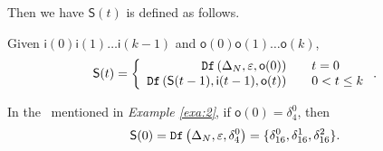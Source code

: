  Then we have $\mathsf{S}(t)$ is defined as follows. 
 \begin{definition}[$\mathsf{S}(t)$] Given $\mathsf{i}(0)\mathsf{i}(1)\ldots\mathsf{i}(k-1)$ and $\mathsf{o}(0)\mathsf{o}(1)\ldots\mathsf{o}(k)$, %
	\[\mathsf{S}(t)=\left\{
\begin{array}{rcl}
{\tt Df}\left(\Delta_N,\varepsilon,\mathsf{o}(0)\right)      &      & {t=0}\\
{\tt Df}\left(\mathsf{S}(t-1),\mathsf{i}(t-1),\mathsf{o}(t)\right)       &      & 0<t\leq k
\end{array} \right. .\]

\end{definition}
\begin{example}
In the \BCN\ mentioned in {\em Example \ref{exa:2}}, if $\mathsf{o}(0)=\delta_4^0$, then \[\mathsf{S}(0)={\tt Df}\left(\Delta_N,\varepsilon,\delta_4^0\right)=\{\delta_{16}^0,\delta_{16}^1,\delta_{16}^2\}.\]
 \label{exa:8}
 \end{example}   
 

 
 


